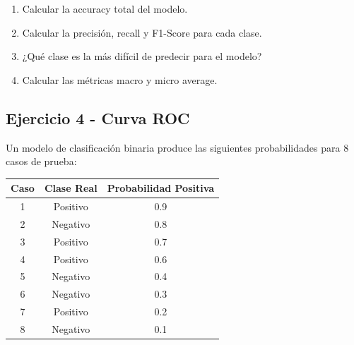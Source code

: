 \documentclass[12pt]{article}
\begin{document}
\begin{center}
\end{center}

\begin{enumerate}
    \item[a.] Calcular la accuracy total del modelo.
    \item[b.] Calcular la precisión, recall y F1-Score para cada clase.
    \item[c.] ¿Qué clase es la más difícil de predecir para el modelo?
    \item[d.] Calcular las métricas macro y micro average.
\end{enumerate}

\subsection{Ejercicio 4 - Curva ROC}

Un modelo de clasificación binaria produce las siguientes probabilidades para 8 casos de prueba:

\begin{table}[H]
    \centering
    \begin{tabular}{|c|c|c|}
        \hline
        \textbf{Caso} & \textbf{Clase Real} & \textbf{Probabilidad Positiva} \\
        \hline
        1 & Positivo & 0.9 \\
        \hline
        2 & Negativo & 0.8 \\
        \hline
        3 & Positivo & 0.7 \\
        \hline
        4 & Positivo & 0.6 \\
        \hline
        5 & Negativo & 0.4 \\
        \hline
        6 & Negativo & 0.3 \\
        \hline
        7 & Positivo & 0.2 \\
        \hline
        8 & Negativo & 0.1 \\
        \hline
    \end{tabular}
\end{table}
\end{document}
